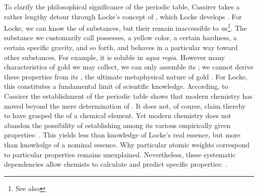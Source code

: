 \documentclass[submitted,12pt]{article}
\begin{document}
To clarify the philosophical significance of the periodic table, Cassirer takes a rather lengthy detour through Locke's concept of , which Locke develops  . For Locke, we can know the  of substances, but their  remain inaccessible to us\footnote{See also }. The substance we customarily call  possesses, a yellow color, a certain hardness, a certain specific gravity, and so forth, and behaves in a particular way toward other substances. For example, it is soluble in \textit{aqua regia}. However many characteristics of gold we may collect, we can only assemble its ; we cannot derive these properties from its , the ultimate metaphysical nature of gold \citep[see][6.III]{Cassirer1907}. For Locke, this constitutes a fundamental limit of scientific knowledge. According, to Cassirer the establishment of the periodic table shows that modern chemistry has moved beyond the mere determination of . It does not, of course, claim thereby to have grasped the  of a chemical element. Yet modern chemistry does not abandon the possibility of establishing  among its various empirically given properties:  . This yields less than knowledge of Locke's real essence, but more than knowledge of a nominal essence. Why particular atomic weights correspond to particular properties remains unexplained. Nevertheless, these systematic dependencies allow chemists to calculate and predict specific properties:  .
\end{document}
